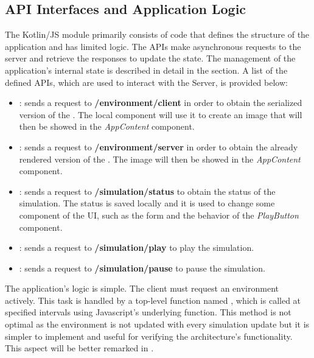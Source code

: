 \subsection{API Interfaces and Application Logic}
\label{ssec:api-interfaces-and-application-logic}
The Kotlin/JS module primarily consists of code that defines the structure of the application and has limited logic. The APIs make asynchronous requests to the server and retrieve the responses to update the state. The management of the application's internal state is described in detail in the  section. A list of the defined APIs, which are used to interact with the Server, is provided below:
\begin{itemize}
	\item {}: sends a request to \textbf{/environment/client} in order to obtain the serialized version of the . The local  component will use it to create an image that will then be showed in the \textit{AppContent} component.
	\item {}: sends a request to \textbf{/environment/server} in order to obtain the already rendered version of the . The image will then be showed in the \textit{AppContent} component.
	\item {}: sends a request to \textbf{/simulation/status} to obtain the status of the simulation. The status is saved locally and it is used to change some component of the UI, such as the form and the behavior of the \textit{PlayButton} component.
	\item {}: sends a request to \textbf{/simulation/play} to play the simulation.
	\item {}: sends a request to \textbf{/simulation/pause} to pause the simulation.
\end{itemize}

The application's logic is simple. The client must request an environment actively. This task is handled by a top-level function named , which is called at specified intervals using Javascript's underlying  function. This method is not optimal as the environment is not updated with every simulation update but it is simpler to implement and useful for verifying the architecture's functionality. This aspect will be better remarked in .
